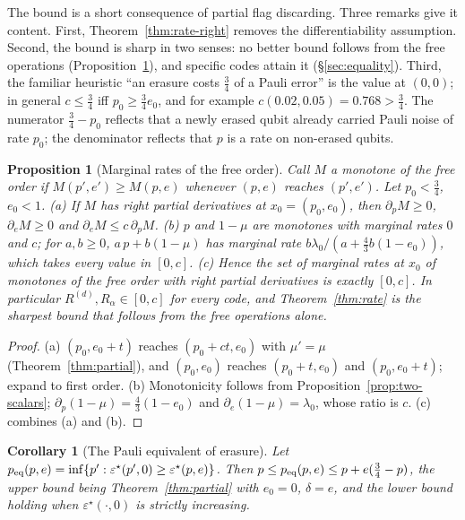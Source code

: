 \documentclass[11pt,a4paper]{article}
\theoremstyle{plain}
\newtheorem{proposition}[theorem]{Proposition}
\newtheorem{corollary}[theorem]{Corollary}
\theoremstyle{definition}
\theoremstyle{remark}
\newcommand{\err}{\varepsilon^{\star}}
\begin{document}
\noindent The bound is a short consequence of partial flag discarding. Three remarks give it content. First, Theorem~\ref{thm:rate-right} removes the differentiability assumption. Second, the bound is sharp in two senses: no better bound follows from the free operations (Proposition~\ref{prop:marginal}), and specific codes attain it (\S\ref{sec:equality}). Third, the familiar heuristic ``an erasure costs $\tfrac34$ of a Pauli error'' is the value at $(0,0)$; in general $c\le\tfrac34$ iff $p_0\ge\tfrac34e_0$, and for example $c(0.02,0.05)=0.768>\tfrac34$. The numerator $\tfrac34-p_0$ reflects that a newly erased qubit already carried Pauli noise of rate $p_0$; the denominator reflects that $p$ is a rate on non-erased qubits.

\begin{proposition}[Marginal rates of the free order]\label{prop:marginal}
Call $M$ a monotone of the free order if $M(p',e')\ge M(p,e)$ whenever $(p,e)$ reaches $(p',e')$. Let $p_0<\tfrac34$, $e_0<1$.
(a) If $M$ has right partial derivatives at $x_0=(p_0,e_0)$, then $\partial_pM\ge0$, $\partial_eM\ge0$ and $\partial_eM\le c\,\partial_pM$.
(b) $p$ and $1-\mu$ are monotones with marginal rates $0$ and $c$; for $a,b\ge0$, $a\,p+b(1-\mu)$ has marginal rate $b\lambda_0/(a+\tfrac43b(1-e_0))$, which takes every value in $[0,c]$.
(c) Hence the set of marginal rates at $x_0$ of monotones of the free order with right partial derivatives is exactly $[0,c]$. In particular $R^{(d)},R_\alpha\in[0,c]$ for every code, and Theorem~\ref{thm:rate} is the sharpest bound that follows from the free operations alone.
\end{proposition}
\begin{proof}
(a) $(p_0,e_0+t)$ reaches $(p_0+ct,e_0)$ with $\mu'=\mu$ (Theorem~\ref{thm:partial}), and $(p_0,e_0)$ reaches $(p_0+t,e_0)$ and $(p_0,e_0+t)$; expand to first order. (b) Monotonicity follows from Proposition~\ref{prop:two-scalars}; $\partial_p(1-\mu)=\tfrac43(1-e_0)$ and $\partial_e(1-\mu)=\lambda_0$, whose ratio is $c$. (c) combines (a) and (b).
\end{proof}

\begin{corollary}[The Pauli equivalent of erasure]\label{cor:worth}
Let $p_{\rm eq}(p,e)=\inf\{p':\err(p',0)\ge\err(p,e)\}$. Then $p\le p_{\rm eq}(p,e)\le p+e(\tfrac34-p)$, the upper bound being Theorem~\ref{thm:partial} with $e_0=0$, $\delta=e$, and the lower bound holding when $\err(\cdot,0)$ is strictly increasing.
\end{corollary}
\end{document}

